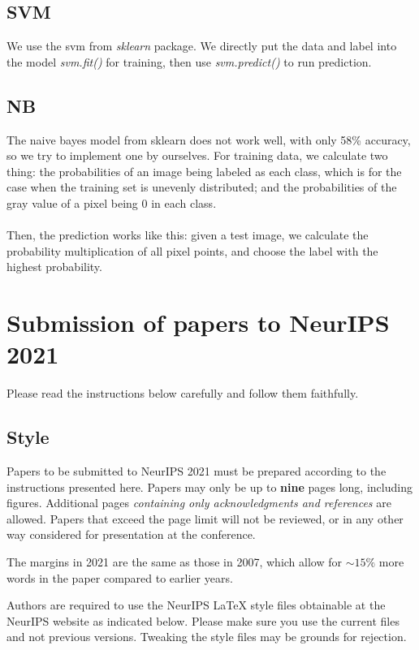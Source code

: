 \documentclass{article}
\begin{document}
	\subsection{SVM}
	
	We use the svm from \textit{sklearn} package. We directly put the data and label into the model \textit{svm.fit()} for training, then use \textit{svm.predict()} to run prediction.
	
	\subsection{NB}
	
	 The naive bayes model from sklearn does not work well, with only 58\% accuracy, so we try to implement one by ourselves. For training data, we calculate two thing: the probabilities of an image being labeled as each class, which is for the case when the training set is unevenly distributed; and the probabilities of the gray value of a pixel being $0$ in each class. \\ \\
	 Then, the prediction works like this: given a test image, we calculate the probability multiplication of all pixel points, and choose the label with the highest probability.
	
	\section{Submission of papers to NeurIPS 2021}
	
	Please read the instructions below carefully and follow them faithfully.
	
	\subsection{Style}
	
	Papers to be submitted to NeurIPS 2021 must be prepared according to the
	instructions presented here. Papers may only be up to {\bf nine} pages long,
	including figures. Additional pages \emph{containing only acknowledgments and
		references} are allowed. Papers that exceed the page limit will not be
	reviewed, or in any other way considered for presentation at the conference.
	
	The margins in 2021 are the same as those in 2007, which allow for $\sim$$15\%$
	more words in the paper compared to earlier years.
	
	Authors are required to use the NeurIPS \LaTeX{} style files obtainable at the
	NeurIPS website as indicated below. Please make sure you use the current files
	and not previous versions. Tweaking the style files may be grounds for
	rejection.
	
\end{document}
